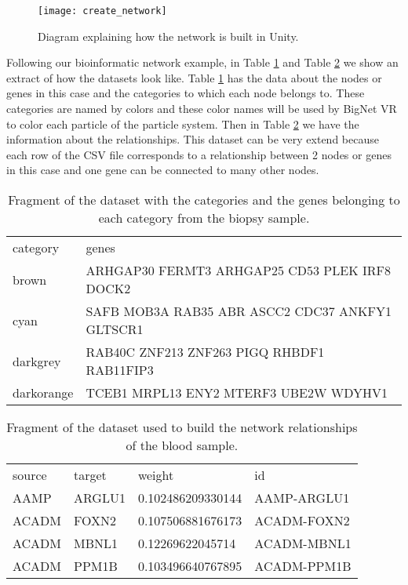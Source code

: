 \begin{figure}[h!]
    \centering%
    \texttt{[image: create\_network]}
    \caption{Diagram explaining how the network is built in Unity.}
    \label{fig:create_network}
\end{figure}%

Following our bioinformatic network example, in Table \ref{tab:categories-data} and Table \ref{tab:network-data} we show an extract of how the datasets look like. Table \ref{tab:categories-data} has the data about the nodes or genes in this case and the categories to which each node belongs to. These categories are named by colors and these color names will be used by BigNet VR to color each particle of the particle system. Then in Table \ref{tab:network-data} we have the information about the relationships. This dataset can be very extend because each row of the CSV file corresponds to a relationship between 2 nodes or genes in this case and one gene can be connected to many other nodes.

\begin{table}[h!]
\centering
\begin{tabular}{ll}
\hline
category & genes          \\
brown   & ARHGAP30 FERMT3 ARHGAP25 CD53 PLEK IRF8 DOCK2\\
cyan  & SAFB MOB3A RAB35 ABR ASCC2 CDC37 ANKFY1 GLTSCR1\\
darkgrey  & RAB40C ZNF213 ZNF263 PIGQ RHBDF1 RAB11FIP3\\
darkorange  & TCEB1 MRPL13 ENY2 MTERF3 UBE2W WDYHV1\\
\hline
\end{tabular}
\caption{Fragment of the dataset with the categories and the genes belonging to each category from the biopsy sample.}
\label{tab:categories-data}
\end{table}

\begin{table}[h!]
\centering
\begin{tabular}{llll}
\hline
source & target & weight            & id          \\
AAMP   & ARGLU1 & 0.102486209330144 & AAMP-ARGLU1 \\
ACADM  & FOXN2  & 0.107506881676173 & ACADM-FOXN2 \\
ACADM  & MBNL1  & 0.12269622045714  & ACADM-MBNL1 \\
ACADM  & PPM1B  & 0.103496640767895 & ACADM-PPM1B \\
\hline
\end{tabular}
\caption{Fragment of the dataset used to build the network relationships of the blood sample.}
\label{tab:network-data}
\end{table}

